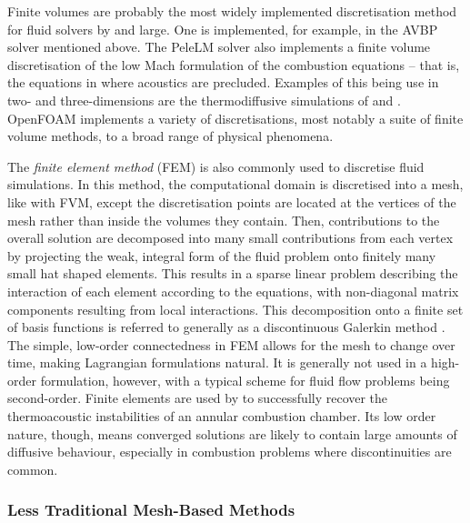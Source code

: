Finite volumes are probably the most widely implemented discretisation method for fluid solvers by and large. One is implemented, for example, in the AVBP solver mentioned above. The PeleLM solver \cite{amrex-combustionPeleLM} also implements a finite volume discretisation of the low Mach formulation of the combustion equations -- that is, the equations in  where acoustics are precluded. Examples of this being use in two- and three-dimensions are the thermodiffusive simulations of \cite{howarth2022EmpiricalCharacteristicScaling} and \cite{howarth2023ThermodiffusivelyUnstableLeanPremixed}. OpenFOAM \cite{opencfdltd2004OpenFOAM} implements a variety of discretisations, most notably a suite of finite volume methods, to a broad range of physical phenomena.

The \emph{finite element method} (FEM) is also commonly used to discretise fluid simulations. In this method, the computational domain is discretised into a mesh, like with FVM, except the discretisation points are located at the vertices of the mesh rather than inside the volumes they contain. Then, contributions to the overall solution are decomposed into many small contributions from each vertex by projecting the weak, integral form of the fluid problem onto finitely many small hat shaped elements. This results in a sparse linear problem describing the interaction of each element according to the equations, with non-diagonal matrix components resulting from local interactions. This decomposition onto a finite set of basis functions is referred to generally as a discontinuous Galerkin method \cite{zienkiewicz20051StandardDiscrete}. The simple, low-order connectedness in FEM allows for the mesh to change over time, making Lagrangian formulations natural. It is generally not used in a high-order formulation, however, with a typical scheme for fluid flow problems being second-order. Finite elements are used by \cite{camporeale2010FiniteElementMethod} to successfully recover the thermoacoustic instabilities of an annular combustion chamber. Its low order nature, though, means converged solutions are likely to contain large amounts of diffusive behaviour, especially in combustion problems where discontinuities are common.



\subsubsection{Less Traditional Mesh-Based Methods}

